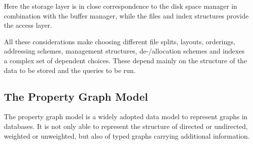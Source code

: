         Here the storage layer is in close correspondence to the disk space manager in combination with the buffer manager, while the files and index structures provide the access layer.

        All these considerations make choosing different file splits, layouts, orderings, addressing schemes, management structures, de-/allocation schemes and indexes a complex set of dependent choices. 
        These depend mainly on the structure of the data to be stored and the queries to be run.


    \subsection{The Property Graph Model}\label{\positionnumber}
        The property graph model is a widely adopted data model to represent graphs in databases.
        It is not only able to represent the structure of directed or undirected, weighted or unweighted, but also of typed graphs carrying additional information.
    
